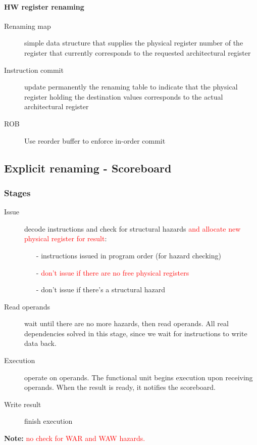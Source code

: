 \paragraph{HW register renaming}
\begin{description}
    \item[Renaming map] simple data structure that supplies the physical register number of the register that
    currently corresponds to the requested architectural register
    \item[Instruction commit] update permanently the renaming table to indicate that the physical register holding
    the destination values corresponds to the actual architectural register
    \item[ROB] Use reorder buffer to enforce in-order commit
\end{description}

\subsection{Explicit renaming - Scoreboard}\label{subsec:explicit-renaming---scoreboard}
\subsubsection{Stages}
\begin{description}
    \item[Issue] decode instructions and check for structural hazards \textcolor{red}{and allocate new physical
    register for result}:
    \begin{itemize}[noitemsep]
        \item[-] instructions issued in program order (for hazard checking)
        \item[-] \textcolor{red}{don't issue if there are no free physical registers}
        \item[-] don't issue if there's a structural hazard
    \end{itemize}
    \item[Read operands] wait until there are no more hazards, then read operands.
    All real dependencies solved in this stage, since we wait for instructions to write data back.
    \item[Execution] operate on operands.
    The functional unit begins execution upon receiving operands.
    When the result is ready, it notifies the scoreboard.
    \item[Write result] finish execution
\end{description}
\textbf{Note:} \textcolor{red}{no check for WAR and WAW hazards.}

